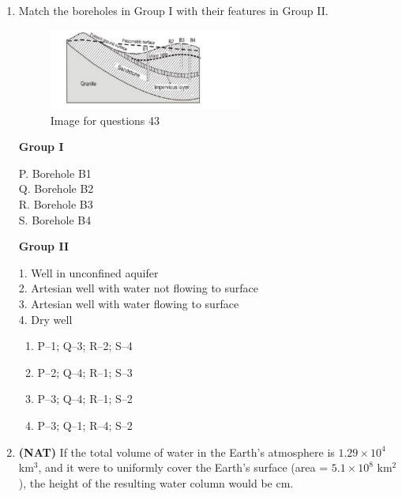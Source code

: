 \documentclass[journal,12pt,onecolumn]{IEEEtran}
\theoremstyle{remark}
\begin{document}
\begin{enumerate}
\item Match the boreholes in Group I with their features in Group II.

\begin{figure}[H]
    \centering
    \includegraphics[width=0.6\textwidth]{figs/fig8.png}
    \caption{Image for questions 43}
    \label{fig:question43}
\end{figure}

\begin{multicols}{2}
\textbf{Group I}  
\begin{flushleft}
P. Borehole B1\\
Q. Borehole B2\\
R. Borehole B3\\
S. Borehole B4
\end{flushleft}

\columnbreak

\textbf{Group II}  
\begin{flushleft}
1. Well in unconfined aquifer\\
2. Artesian well with water not flowing to surface\\
3. Artesian well with water flowing to surface\\
4. Dry well
\end{flushleft}
\end{multicols}

\begin{multicols}{2}
\begin{enumerate}
\item P--1; Q--3; R--2; S--4  
\item P--2; Q--4; R--1; S--3  
\item P--3; Q--4; R--1; S--2  
\item P--3; Q--1; R--4; S--2  
\end{enumerate}
\end{multicols}

\item \textbf{(NAT)} If the total volume of water in the Earth's atmosphere is \(1.29 \times 10^4\) km\(^3\), and it were to uniformly cover the Earth's surface (area = \(5.1 \times 10^8\) km\(^2\)), the height of the resulting water column would be \underline{\hspace{3cm}} cm.  
\vspace{0.3cm}


\end{enumerate}
\end{document}
